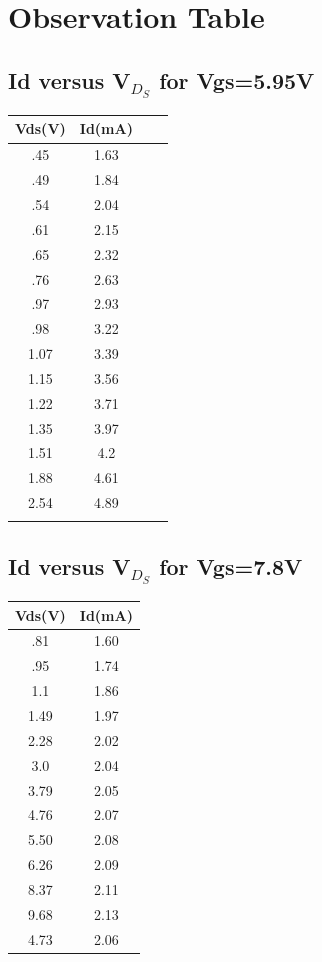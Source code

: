 \documentclass[12pt]{article}
\begin{document}

\section*{Observation Table}
\subsection{Id versus V$_D_S$ for Vgs=5.95V}
\begin{center}
 \begin{tabular}{|| c c | c c||} 
 \hline
 Vds(V) & Id(mA) \\ [0.5ex] 
 \hline\hline
 .45 & 1.63\\
 \hline
 .49 & 1.84\\
 \hline
 .54 & 2.04\\
 \hline
 .61 & 2.15\\
 \hline
 .65 &2.32\\
 \hline
 .76&2.63\\
 \hline
 .97&2.93\\
 \hline
 .98&3.22\\
 \hline
 1.07&3.39\\
 \hline
 1.15&3.56\\
 \hline
 1.22&3.71\\
 \hline
 1.35&3.97\\
 \hline
 1.51&4.2\\
 \hline
 1.88&4.61\\
 \hline
 2.54&4.89\\
 \hline\\
\end{tabular}
\end{center}

\subsection{Id versus V$_D_S$ for Vgs=7.8V}
\begin{center}
 \begin{tabular}{|| c | c||} 
 \hline
 Vds(V) & Id(mA) \\ [0.5ex] 
 \hline\hline
 .81&1.60\\
 \hline
 .95&1.74\\
 \hline
 1.1&1.86\\
 \hline
 1.49&1.97\\
 \hline
 2.28&2.02\\
 \hline
 3.0&2.04\\
 \hline
 3.79&2.05\\
 \hline
 4.76&2.07\\
 \hline
 5.50&2.08\\
 \hline
 6.26&2.09\\
 \hline
 8.37&2.11\\
 \hline
 9.68&2.13\\
 \hline
 4.73&2.06\\
 \hline
\end{tabular}
\end{center}
\end{document}
